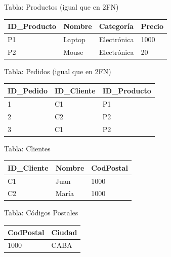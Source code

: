 \documentclass[12pt]{article}
\begin{document}
Tabla: Productos (igual que en 2FN)
\begin{center}
\begin{tabular}{llll}
\toprule
ID\_Producto & Nombre & Categoría & Precio \\
\midrule
P1 & Laptop & Electrónica & 1000 \\
P2 & Mouse & Electrónica & 20 \\
\bottomrule
\end{tabular}
\end{center}

Tabla: Pedidos (igual que en 2FN)
\begin{center}
\begin{tabular}{lll}
\toprule
ID\_Pedido & ID\_Cliente & ID\_Producto \\
\midrule
1 & C1 & P1 \\
2 & C2 & P2 \\
3 & C1 & P2 \\
\bottomrule
\end{tabular}
\end{center}

Tabla: Clientes
\begin{center}
\begin{tabular}{lll}
\toprule
ID\_Cliente & Nombre & CodPostal \\
\midrule
C1 & Juan & 1000 \\
C2 & María & 1000 \\
\bottomrule
\end{tabular}
\end{center}

Tabla: Códigos Postales
\begin{center}
\begin{tabular}{ll}
\toprule
CodPostal & Ciudad \\
\midrule
1000 & CABA \\
\bottomrule
\end{tabular}
\end{center}
\end{document}
